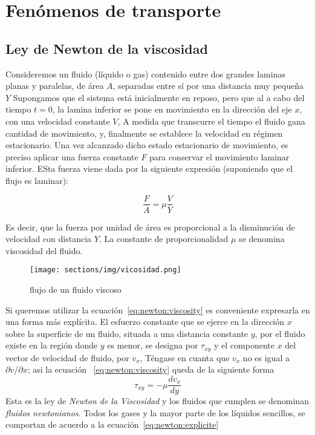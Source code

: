 \section{Fenómenos de transporte}
\subsection{Ley de Newton de la viscosidad}
Consideremos un fluido (líquido o gas) contenido
entre dos grandes laminas planas y paralelas, de área $A$,
separadas entre sí por una distancia muy pequeña $Y$
Supongamos que el sistema está inicialmente en reposo, pero
que al a cabo del tiempo $t=0$, la lamina inferior se pone
en movimiento en la dirección del eje $x$, con una velocidad
constante $V$, A medida que transcurre el tiempo el fluido
gana cantidad de movimiento, y, finalmente se establece
la velocidad en régimen estacionario. Una vez alcanzado
dicho estado estacionario de movimiento, es preciso aplicar
una fuerza constante $F$ para conservar el movimiento laminar
inferior. ESta fuerza viene dada por la siguiente expresión
(suponiendo que el flujo es laminar):

\begin{equation}
    \label{eq:newton:viscosity}
    \frac{F}{A} = \mu \frac{V}{Y}
\end{equation}

Es decir, que la fuerza por unidad de área es proporcional
a la disminución de velocidad con distancia $Y$. La constante
de proporcionalidad $\mu$ se denomina viscosidad del fluido.

\begin{figure}[ht]
    \begin{center}
        \texttt{[image: sections/img/vicosidad.png]}
    \end{center}
    \caption{flujo de un fluido viscoso}
\end{figure}

Si queremos utilizar la ecuación~\ref{eq:newton:viscosity}
es conveniente expresarla en una forma más explícita. El
esfuerzo constante que se ejerce en la dirección $x$ sobre
la superficie de un fluido, situada a una distancia constante
$y$, por el fluido existe en la región donde $y$ es menor,
se designa por $\tau_{xy}$ y el componente $x$ del vector
de velocidad de fluido, por $v_{x}$, Téngase en cuanta que
$v_x$ no es igual a $\partial v/ \partial x$; asi la ecuación
~\ref{eq:newton:viscosity} queda de la siguiente forma
\begin{equation}
    \label{eq:newton:explicite}
    \tau_{xy}=-\mu \frac{dv_x}{dy}
\end{equation}
Esta es la ley de \textit{Newton de la Viscosidad}
y los fluidos que cumplen se denominan
\textit{fluidos newtonianos}. Todos
los gases y la mayor parte de los líquidos sencillos,
se comportan de acuerdo a la ecuación~\ref{eq:newton:explicite}

